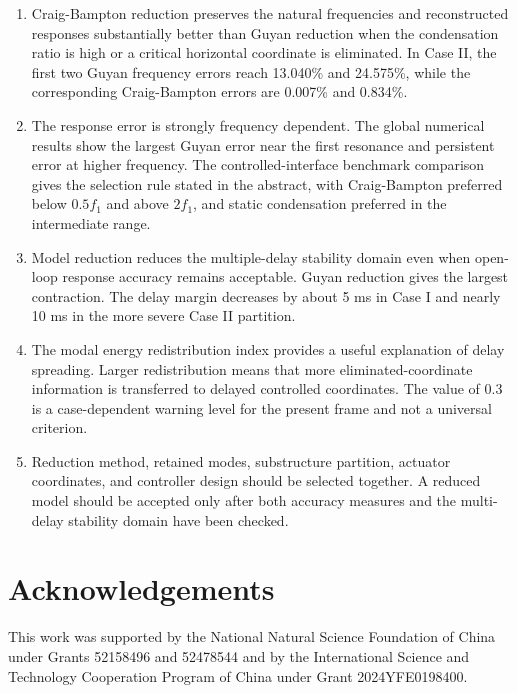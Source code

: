 \documentclass[11pt,a4paper]{article}
\begin{document}
\begin{enumerate}[leftmargin=2.2em]
\item Craig-Bampton reduction preserves the natural frequencies and reconstructed responses substantially better than Guyan reduction when the condensation ratio is high or a critical horizontal coordinate is eliminated. In Case II, the first two Guyan frequency errors reach 13.040\% and 24.575\%, while the corresponding Craig-Bampton errors are 0.007\% and 0.834\%.
\item The response error is strongly frequency dependent. The global numerical results show the largest Guyan error near the first resonance and persistent error at higher frequency. The controlled-interface benchmark comparison gives the selection rule stated in the abstract, with Craig-Bampton preferred below $0.5f_1$ and above $2f_1$, and static condensation preferred in the intermediate range.
\item Model reduction reduces the multiple-delay stability domain even when open-loop response accuracy remains acceptable. Guyan reduction gives the largest contraction. The delay margin decreases by about 5 ms in Case I and nearly 10 ms in the more severe Case II partition.
\item The modal energy redistribution index provides a useful explanation of delay spreading. Larger redistribution means that more eliminated-coordinate information is transferred to delayed controlled coordinates. The value of 0.3 is a case-dependent warning level for the present frame and not a universal criterion.
\item Reduction method, retained modes, substructure partition, actuator coordinates, and controller design should be selected together. A reduced model should be accepted only after both accuracy measures and the multi-delay stability domain have been checked.
\end{enumerate}

\section*{Acknowledgements}
This work was supported by the National Natural Science Foundation of China under Grants 52158496 and 52478544 and by the International Science and Technology Cooperation Program of China under Grant 2024YFE0198400.
\end{document}
